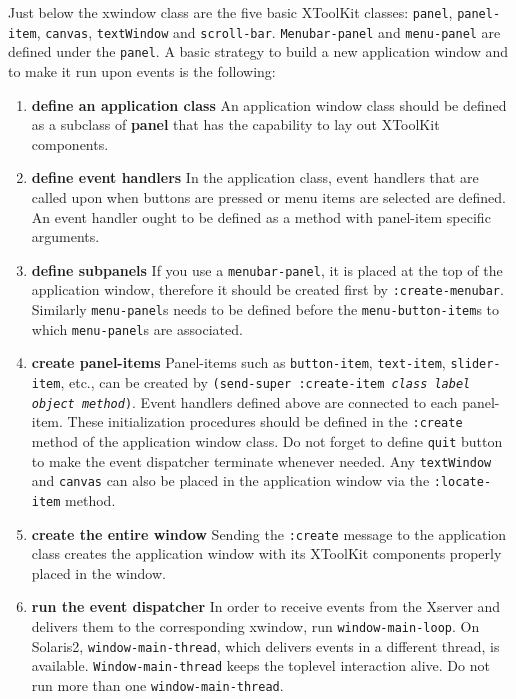 Just below the xwindow class are the five basic XToolKit classes:
{\tt panel}, {\tt panel-item},
{\tt canvas}, {\tt textWindow} and {\tt scroll-bar}.
{\tt Menubar-panel} and {\tt menu-panel} are defined under the {\tt panel}.
A basic strategy to build a new application window and to make
it run upon events is the following:
\begin{enumerate}
\item{\bf define an application class} An application window class should be
defined as a subclass of {\bf panel} that has the capability to lay out
XToolKit components.
\item{\bf define event handlers} In the application class, event handlers
that are called upon when buttons are pressed or menu items are selected
are defined. An event handler ought to be defined as a method 
with panel-item specific arguments.
\item{\bf define subpanels} If you use a {\tt menubar-panel}, it is placed at the
top of the application window, therefore it should be created first
by {\tt :create-menubar}. Similarly {\tt menu-panel}s needs to be
defined before the {\tt menu-button-item}s to which {\tt menu-panel}s
are associated.
\item{\bf create panel-items} Panel-items such as {\tt button-item},
{\tt text-item}, {\tt slider-item}, etc., can be created
by {\tt (send-super :create-item {\em class label object method})}.
Event handlers defined above are connected to each panel-item.
These initialization procedures should be defined in the {\tt :create}
method of the application window class.
Do not forget to define {\tt quit} button to make the event
dispatcher terminate whenever needed.
Any {\tt textWindow} and {\tt canvas} can also be placed in the application
window via the {\tt :locate-item} method.
\item{\bf create the entire window} Sending the {\tt :create} message to
the application class creates
the application window with its XToolKit components properly placed 
in the window.
\item{\bf run the event dispatcher} In order to receive events from the
Xserver and delivers them to the corresponding xwindow,
run {\tt window-main-loop}.
On Solaris2, {\tt window-main-thread}, which delivers events in a
different thread, is available.
{\tt Window-main-thread} keeps the toplevel interaction alive.
Do not run more than one {\tt window-main-thread}.
\end{enumerate}

